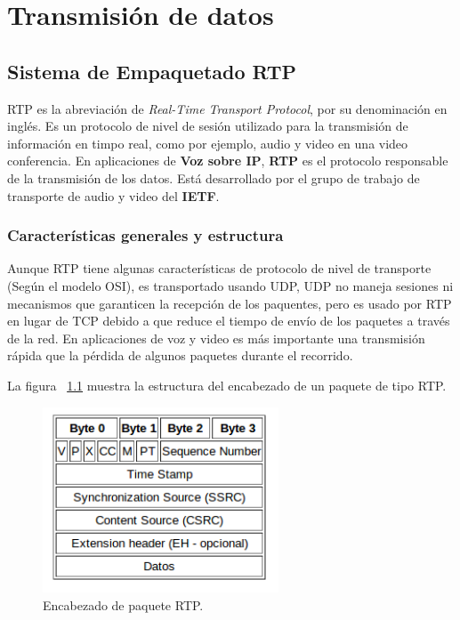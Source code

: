 \chapter{Transmisión de datos}

\section{Sistema de Empaquetado RTP}

RTP es la abreviación de \textit{Real-Time Transport Protocol}, por su denominación en inglés. Es un protocolo de nivel de sesión utilizado para la transmisión de información en timpo real, como por ejemplo, audio y video en una video conferencia.  En aplicaciones de \textbf{Voz sobre IP}, \textbf{RTP} es el protocolo responsable de la transmisión de los datos. Está desarrollado por el grupo de trabajo de transporte de audio y video del \textbf{IETF}.


\subsection{Características generales y estructura}
Aunque RTP tiene algunas características de protocolo de nivel de transporte (Según el modelo OSI), es transportado usando UDP, UDP no maneja sesiones ni mecanismos que garanticen la recepción de los paquentes, pero es usado por RTP en lugar de TCP debido a que reduce el tiempo de envío de los paquetes a través de la red. En aplicaciones de voz y video es más importante una transmisión rápida que la pérdida de algunos paquetes durante el recorrido.

La figura ~\ref{rtp} muestra la estructura del encabezado de un paquete de tipo RTP.

\begin{figure}[H]
\centering
\includegraphics[width=7cm]{logos/rtp.png}
\caption{Encabezado de paquete RTP.}
\label{rtp}
\end{figure}


